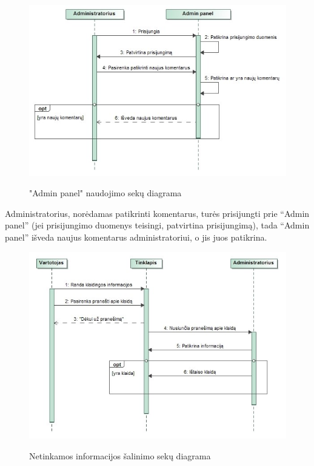 \documentclass{VUMIFPSkursinis}
\begin{document}
\begin{figure}[H]
    \centering
    \includegraphics[scale=0.7]{img/geri/_adminNaujiCom}
    \label{img:uml21}
	\caption{"Admin panel" naudojimo sekų diagrama}
\end{figure}

Administratorius, norėdamas patikrinti komentarus, turės prisijungti prie “Admin panel” (jei prisijungimo duomenys teisingi, patvirtina prisijungimą), tada “Admin panel” išveda naujus komentarus administratoriui, o jis juos patikrina.

\begin{figure}[H]
    \centering
    \includegraphics[scale=0.7]{img/geri/_adminError}
    \label{img:uml22}
	\caption{Netinkamos informacijos šalinimo sekų diagrama}
\end{figure}
\end{document}
